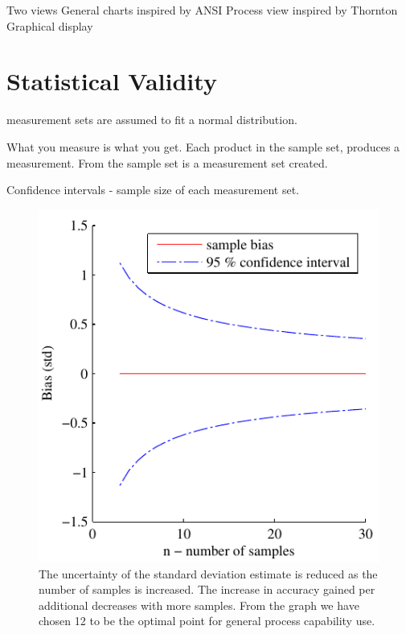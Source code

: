 \documentclass[aip,amsmath, reprint, author-year]{revtex4-1}
\begin{document}
Two views
	General charts inspired by ANSI
	Process view inspired by Thornton Graphical display


\section{Statistical Validity}

measurement sets are assumed to fit a normal distribution.

What you measure is what you get.
Each product in the sample set, produces a measurement. From the sample set is a  measurement set created. 

Confidence intervals - sample size of each measurement set.

\begin{figure}
\includegraphics{stats_bias_confidence.pdf}
\caption{\label{fig:std_uncertainty}The uncertainty of the standard deviation estimate is reduced as the number of samples is increased. The increase in accuracy gained per additional decreases with more samples. From the graph we have chosen 12 to be the optimal point for general process capability use.}
\end{figure}
\end{document}
